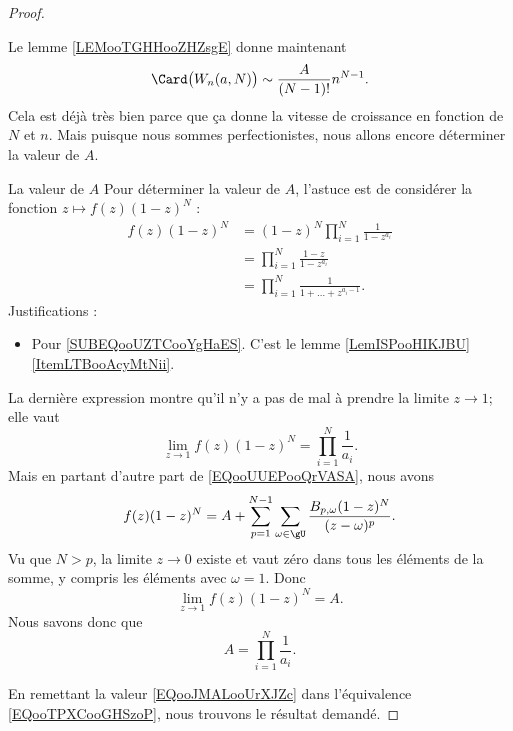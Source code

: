 \begin{proof}
\begin{subproof}
		Le lemme \ref{LEMooTGHHooZHZsgE} donne maintenant
		\begin{equation}        \label{EQooTPXCooGHSzoP}
			\Card\big( W_n(a,N) \big)\sim \frac{ A }{ (N-1)! }n^{N-1}.
		\end{equation}
		Cela est déjà très bien parce que ça donne la vitesse de croissance en fonction de \( N\) et \( n\). Mais puisque nous sommes perfectionistes, nous allons encore déterminer la valeur de \( A\).
		\item[La valeur de \( A\)]
		Pour déterminer la valeur de \( A\), l'astuce est de considérer la fonction \( z\mapsto f(z)(1-z)^N\) :
		\begin{subequations}
			\begin{align}
				f(z)(1-z)^N & =(1-z)^N\prod_{i=1}^N\frac{1}{ 1-z^{a_i} }                                      \\
				            & =\prod_{i=1}^N\frac{ 1-z }{ 1-z^{a_i} }                                         \\
				            & =\prod_{i=1}^N\frac{1}{ 1+\ldots +z^{a_i-1} }.      \label{SUBEQooUZTCooYgHaES}
			\end{align}
		\end{subequations}
		Justifications :
		\begin{itemize}
			\item Pour \eqref{SUBEQooUZTCooYgHaES}. C'est le lemme \ref{LemISPooHIKJBU}\ref{ItemLTBooAcyMtNii}.
		\end{itemize}
		La dernière expression montre qu'il n'y a pas de mal à prendre la limite \( z\to 1\); elle vaut
		\begin{equation}
			\lim_{z\to 1} f(z)(1-z)^N=\prod_{i=1}^N\frac{1}{ a_i }.
		\end{equation}
		Mais en partant d'autre part de \eqref{EQooUUEPooQrVASA}, nous avons
		\begin{equation}
			f(z)(1-z)^N=A+\sum_{p=1}^{N-1}\sum_{\omega\in \gU}\frac{ B_{p,\omega}(1-z)^N }{ (z-\omega)^p }.
		\end{equation}
		Vu que \( N>p\), la limite \( z\to 0\) existe et vaut zéro dans tous les éléments de la somme, y compris les éléments avec \( \omega=1\). Donc
		\begin{equation}
			\lim_{z\to 1}f(z)(1-z)^N=A.
		\end{equation}
		Nous savons donc que
		\begin{equation}        \label{EQooJMALooUrXJZc}
			A=\prod_{i=1}^N\frac{1}{ a_i }.
		\end{equation}
	\end{subproof}
	En remettant la valeur \eqref{EQooJMALooUrXJZc} dans l'équivalence \eqref{EQooTPXCooGHSzoP}, nous trouvons le résultat demandé.
\end{proof}

